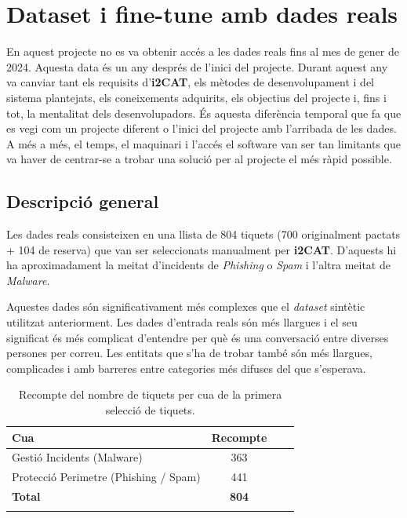 \section{Dataset i fine-tune amb dades reals}
En aquest projecte no es va obtenir accés a les dades reals fins al mes de gener de 2024. Aquesta data és un any després de l'inici del projecte. Durant aquest any va canviar tant els requisits d'\textbf{i2CAT}, els mètodes de desenvolupament i del sistema plantejats, els coneixements adquirits, els objectius del projecte i, fins i tot, la mentalitat dels desenvolupadors. És aquesta diferència temporal que fa que es vegi com un projecte diferent o l'inici del projecte amb l'arribada de les dades. A més a més, el temps, el maquinari i l'accés el software van ser tan limitants que va haver de centrar-se a trobar una solució per al projecte el més ràpid possible.

\subsection{Descripció general}
Les dades reals consisteixen en una llista de 804 tiquets (700 originalment pactats + 104 de reserva) que van ser seleccionats manualment per \textbf{i2CAT}. D'aquests hi ha aproximadament la meitat d'incidents de \textit{Phishing} o \textit{Spam} i l'altra meitat de \textit{Malware}.

Aquestes dades són significativament més complexes que el \textit{dataset} sintètic utilitzat anteriorment. Les dades d'entrada reals són més llargues i el seu significat és més complicat d'entendre per què és una conversació entre diverses persones per correu. Les entitats que s'ha de trobar també són més llargues, complicades i amb barreres entre categories més difuses del que s'esperava.

\begin{table}[H]
    \centering
    \begin{tabular}{lccr}
        \Xhline{2\arrayrulewidth}
        \textbf{Cua} & \textbf{Recompte} \\
        \hline
        Gestió Incidents (Malware) & 363 \\
        Protecció Perimetre (Phishing / Spam) & 441  \\
        \hline
        \textbf{Total} & \textbf{804} \\
        \Xhline{2\arrayrulewidth}
    \end{tabular}
    \caption{Recompte del nombre de tiquets per cua de la primera selecció de tiquets.}
    \label{tab:recompte_per_cua}
\end{table}

